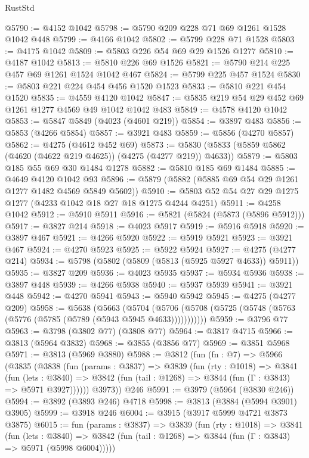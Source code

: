 \begin{lexlean}{RustStd}
\begin{coremodule}
@5790 := @4152 @1042
@5798 := @5790 @209 @228 @71 @69 @1261 @1528 @1042 @448
@5799 := @4166 @1042
@5802 := @5799 @228 @71 @1528
@5803 := @4175 @1042
@5809 := @5803 @226 @54 @69 @29 @1526 @1277
@5810 := @4187 @1042
@5813 := @5810 @226 @69 @1526
@5821 := @5790 @214 @225 @457 @69 @1261 @1524 @1042 @467
@5824 := @5799 @225 @457 @1524
@5830 := @5803 @221 @224 @454 @456 @1520 @1523
@5833 := @5810 @221 @454 @1520
@5835 := @4559 @4120 @1042
@5847 := @5835 @219 @54 @29 @452 @69 @1261 @1277 @4569 @49 @1042 @1042 @483
@5849 := @4578 @4120 @1042
@5853 := @5847 @5849 (@4023 (@4601 @219))
@5854 := @3897 @483
@5856 := @5853 (@4266 @5854)
@5857 := @3921 @483
@5859 := @5856 (@4270 @5857)
@5862 := @4275 (@4612 @452 @69)
@5873 := @5830 (@5833 (@5859 @5862 (@4620 (@4622 @219 @4625)) (@4275 (@4277 @219)) @4633))
@5879 := @5803 @185 @55 @69 @30 @1484 @1278
@5882 := @5810 @185 @69 @1484
@5885 := @4649 @4120 @1042 @93
@5896 := @5879 (@5882 (@5885 @69 @54 @29 @1261 @1277 @1482 @4569 @5849 @5602))
@5910 := @5803 @52 @54 @27 @29 @1275 @1277 (@4233 @1042 @18 @27 @18 @1275 @4244 @4251)
@5911 := @4258 @1042
@5912 := @5910 @5911
@5916 := @5821 (@5824 (@5873 (@5896 @5912)))
@5917 := @3827 @214
@5918 := @4023 @5917
@5919 := @5916 @5918
@5920 := @3897 @467
@5921 := @4266 @5920
@5922 := @5919 @5921
@5923 := @3921 @467
@5924 := @4270 @5923
@5925 := @5922 @5924
@5927 := @4275 (@4277 @214)
@5934 := @5798 (@5802 (@5809 (@5813 (@5925 @5927 @4633)) @5911))
@5935 := @3827 @209
@5936 := @4023 @5935
@5937 := @5934 @5936
@5938 := @3897 @448
@5939 := @4266 @5938
@5940 := @5937 @5939
@5941 := @3921 @448
@5942 := @4270 @5941
@5943 := @5940 @5942
@5945 := @4275 (@4277 @209)
@5958 := @5638
    (@5663
      (@5704 (@5706 (@5708 (@5725 (@5748 (@5763 (@5776 (@5785 (@5789 (@5943 @5945 @4633)))))))))))
@5959 := @3796 @77
@5963 := @3798 (@3802 @77) (@3808 @77)
@5964 := @3817 @4715
@5966 := @3813 (@5964 @3832)
@5968 := @3855 (@3856 @77)
@5969 := @3851 @5968
@5971 := @3813 (@5969 @3880)
@5988 := @3812
    (fun (fn : @7) =>
    @5966
      (@3835
        (@3838
          (fun (params : @3837) =>
          @3839
            (fun (rty : @1018) =>
            @3841
              (fun (lets : @3840) =>
              @3842 (fun (tail : @1268) => @3844 (fun (Γ : @3843) => @5971 @3927))))))
        @3973))
    @246
@5991 := @3979 (@5964 (@3830 @246))
@5994 := @3892 (@3893 @246) @4718
@5998 := @3813 (@3884 (@5994 @3901) @3905)
@5999 := @3918 @246
@6004 := @3915 (@3917 @5999 @4721 @3873 @3875)
@6015 := fun (params : @3837) =>
  @3839
    (fun (rty : @1018) =>
    @3841
      (fun (lets : @3840) =>
      @3842 (fun (tail : @1268) => @3844 (fun (Γ : @3843) => @5971 (@5998 @6004)))))

\end{coremodule}
\end{lexlean}
